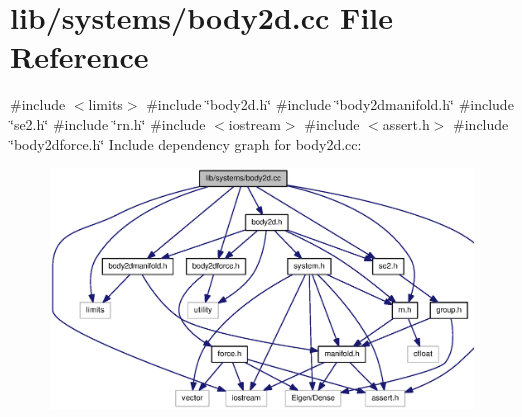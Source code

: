 \section{lib/systems/body2d.cc \-File \-Reference}
\label{body2d_8cc}
{\ttfamily \#include $<$limits$>$}\*
{\ttfamily \#include \char`\"{}body2d.\-h\char`\"{}}\*
{\ttfamily \#include \char`\"{}body2dmanifold.\-h\char`\"{}}\*
{\ttfamily \#include \char`\"{}se2.\-h\char`\"{}}\*
{\ttfamily \#include \char`\"{}rn.\-h\char`\"{}}\*
{\ttfamily \#include $<$iostream$>$}\*
{\ttfamily \#include $<$assert.\-h$>$}\*
{\ttfamily \#include \char`\"{}body2dforce.\-h\char`\"{}}\*
\-Include dependency graph for body2d.\-cc\-:
\nopagebreak
\begin{figure}[H]
\begin{center}
\leavevmode
\includegraphics[width=350pt]{body2d_8cc__incl}
\end{center}
\end{figure}
